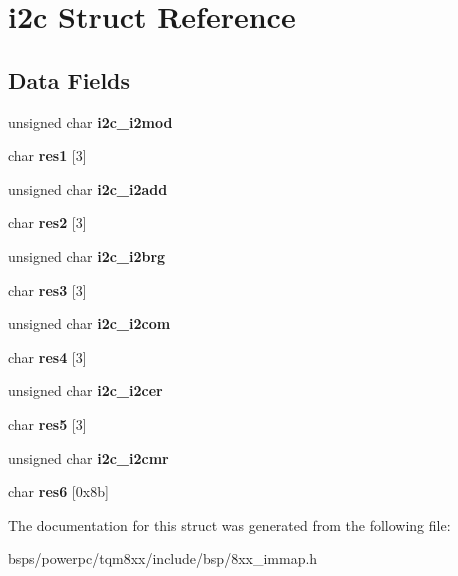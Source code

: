 \hypertarget{structi2c}{}\section{i2c Struct Reference}
\label{structi2c}
\subsection*{Data Fields}
\begin{DoxyCompactItemize}
\item 
\mbox{\label{structi2c_aa1ead4294ed23859d3b4f02ef5578def}} 
unsigned char {\bfseries i2c\+\_\+i2mod}
\item 
\mbox{\label{structi2c_abca4bb9dbbf00f9dee880b61eecafb02}} 
char {\bfseries res1} \mbox{[}3\mbox{]}
\item 
\mbox{\label{structi2c_a8554bf8d772dfce48829189bc50ad119}} 
unsigned char {\bfseries i2c\+\_\+i2add}
\item 
\mbox{\label{structi2c_a88f7af398422bbf0c25ff4987e4589a8}} 
char {\bfseries res2} \mbox{[}3\mbox{]}
\item 
\mbox{\label{structi2c_a26f66fdeb7caf1ab202ae2f93ca7422e}} 
unsigned char {\bfseries i2c\+\_\+i2brg}
\item 
\mbox{\label{structi2c_a48d2602d97d26eec75ab3f7b91a6e9c1}} 
char {\bfseries res3} \mbox{[}3\mbox{]}
\item 
\mbox{\label{structi2c_a78cdb1f2f23fe1c7eb26b90ce9e68b52}} 
unsigned char {\bfseries i2c\+\_\+i2com}
\item 
\mbox{\label{structi2c_aa52223d2ce8d4402ebf7c5e717ccb167}} 
char {\bfseries res4} \mbox{[}3\mbox{]}
\item 
\mbox{\label{structi2c_abc877ef96af45866f02154841adb7de1}} 
unsigned char {\bfseries i2c\+\_\+i2cer}
\item 
\mbox{\label{structi2c_a46ead105fc6bef8d73ae5a16d2b9b444}} 
char {\bfseries res5} \mbox{[}3\mbox{]}
\item 
\mbox{\label{structi2c_a59c99647d6439b29dfe0b9c6d8ba8773}} 
unsigned char {\bfseries i2c\+\_\+i2cmr}
\item 
\mbox{\label{structi2c_a43e545bb943489aa00af3268b4ba7884}} 
char {\bfseries res6} \mbox{[}0x8b\mbox{]}
\end{DoxyCompactItemize}


The documentation for this struct was generated from the following file\+:\begin{DoxyCompactItemize}
\item 
bsps/powerpc/tqm8xx/include/bsp/8xx\+\_\+immap.\+h\end{DoxyCompactItemize}
